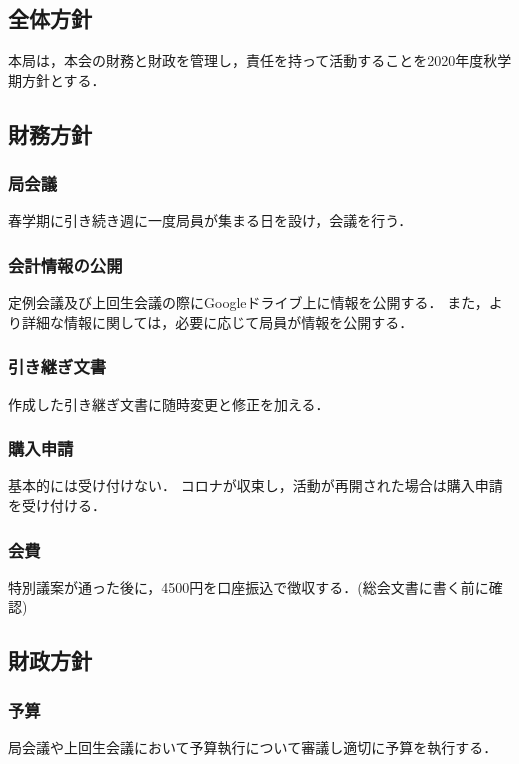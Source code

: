 \subsection*{全体方針}



本局は，本会の財務と財政を管理し，責任を持って活動することを2020年度秋学期方針とする．


\subsection*{財務方針}

\subsubsection*{局会議}
春学期に引き続き週に一度局員が集まる日を設け，会議を行う．

\subsubsection*{会計情報の公開}
定例会議及び上回生会議の際にGoogleドライブ上に情報を公開する．
また，より詳細な情報に関しては，必要に応じて局員が情報を公開する．

\subsubsection*{引き継ぎ文書}
作成した引き継ぎ文書に随時変更と修正を加える．

\subsubsection*{購入申請}
基本的には受け付けない．
コロナが収束し，活動が再開された場合は購入申請を受け付ける．

\subsubsection*{会費}
特別議案が通った後に，4500円を口座振込で徴収する．(総会文書に書く前に確認)


\subsection*{財政方針}

\subsubsection*{予算}
局会議や上回生会議において予算執行について審議し適切に予算を執行する．

